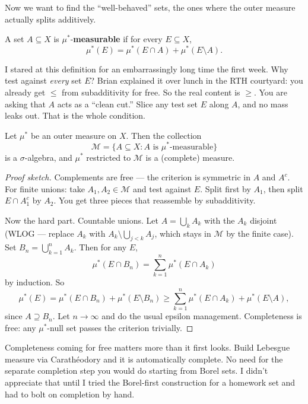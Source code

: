 Now we want to find the ``well-behaved''
sets, the ones where the outer measure actually splits additively.

\begin{definition}[$\mu^*$-measurability]\label{def:caratheodory}
A set $A \subseteq X$ is $\mu^*$-\textbf{measurable} if for every
$E \subseteq X$,
\[
  \mu^*(E) = \mu^*(E \cap A) + \mu^*(E \setminus A).
\]
\end{definition}

I stared at this definition for an embarrassingly long time the first week. Why test against \emph{every} set $E$?
Brian explained it over lunch in the RTH courtyard: you already get $\le$ from subadditivity for free.
So the real content is $\ge$. You are asking that $A$ acts as a
``clean cut.'' Slice any test set $E$ along $A$, and no mass leaks out. That is the whole condition.

\begin{theorem}\label{thm:caratheodory}
Let $\mu^*$ be an outer measure on $X$. Then the collection
\[
  \mathcal{M} = \{ A \subseteq X : A \text{ is }
    \mu^*\text{-measurable} \}
\]
is a $\sigma$-algebra, and $\mu^*$ restricted to $\mathcal{M}$ is a
(complete) measure.
\end{theorem}

\begin{proof}[Proof sketch]
Complements are free --- the criterion is symmetric in $A$ and $A^c$.
For finite unions: take $A_1, A_2 \in \mathcal{M}$ and test against $E$.
Split first by $A_1$, then split $E \cap A_1^c$ by $A_2$. You get three
pieces that reassemble by subadditivity.

Now the hard part. Countable unions. Let $A = \bigcup_k A_k$ with the
$A_k$ disjoint (WLOG --- replace $A_k$ with
$A_k \setminus \bigcup_{j < k} A_j$, which stays in $\mathcal{M}$ by the
finite case). Set $B_n = \bigcup_{k=1}^n A_k$. Then for any $E$,
\[
  \mu^*(E \cap B_n) = \sum_{k=1}^n \mu^*(E \cap A_k)
\]
by induction. So
\[
  \mu^*(E) = \mu^*(E \cap B_n) + \mu^*(E \setminus B_n)
           \ge \sum_{k=1}^n \mu^*(E \cap A_k) + \mu^*(E \setminus A),
\]
since $A \supseteq B_n$. Let $n \to \infty$ and do the usual epsilon
management. Completeness is free: any $\mu^*$-null set passes the
criterion trivially. \qedhere
\end{proof}

\begin{remark}\label{rem:completeness-free}
Completeness coming for free matters more than it first looks. Build Lebesgue
measure via Carath\'eodory and it is automatically complete. No need for
the separate completion step you would do starting from Borel sets. I didn't appreciate that until I tried the Borel-first construction for a homework set and had to bolt on completion by hand.
\end{remark}


